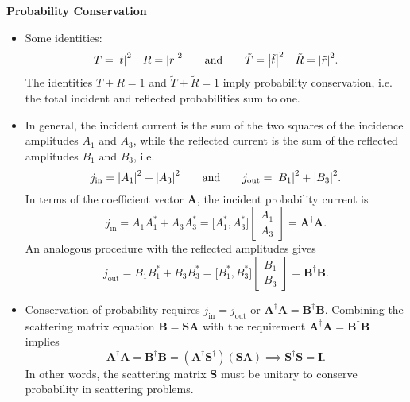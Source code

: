 \documentclass[11pt, a4paper]{article}
\newcommand{\eqtext}[1]{\qquad \text{#1} \qquad}
\renewcommand{\vec}[1]{\bm{#1}} %
\newcommand{\mat}[1]{\mathbf{#1}} %
\begin{document}
\textbf{Probability Conservation}
\begin{itemize}
	\item Some identities:
	\begin{equation*}
		T = \abs{t}^{2} \quad R = \abs{r}^{2} \eqtext{and} 		\tilde{T} = \abs{\tilde{t}}^{2} \quad \tilde{R} = \abs{\tilde{r}}^{2}.
	\end{equation*}
	The identities $ T + R = 1 $ and $ \tilde{T} + \tilde{R} = 1 $ imply probability conservation, i.e. the total incident and reflected probabilities sum to one. 
	
	\item In general, the incident current is the sum of the two squares of the incidence amplitudes $ A_{1} $ and $ A_{3} $, while the reflected current is the sum of the reflected amplitudes $ B_{1} $ and $ B_{3} $, i.e.
	\begin{equation*}
		j_{\text{in}} = \abs{A_{1}}^{2} + \abs{A_{3}}^{2} \eqtext{and} j_{\text{out}} = \abs{B_{1}}^{2} + \abs{B_{3}}^{2}.
	\end{equation*}
	In terms of the coefficient vector $ \vec{A} $, the incident probability current is
	\begin{equation*}
		j_{\text{in}} = A_{1}A_{1}^{*} + A_{3}A_{3}^{*} = \big[A_{1}^{*}, A_{3}^{*}\big]
		\begin{bmatrix}
			A_{1}\\
			A_{3}
		\end{bmatrix}
		= \vec{A}^{\dagger}\vec{A}.
	\end{equation*}
	An analogous procedure with the reflected amplitudes gives
	\begin{equation*}
		j_{\text{out}} = B_{1}B_{1}^{*} + B_{3}B_{3}^{*} = \big[B_{1}^{*}, B_{3}^{*}\big]
		\begin{bmatrix}
			B_{1}\\
			B_{3}
		\end{bmatrix}
		= \vec{B}^{\dagger}\vec{B}.
	\end{equation*}	
	
	\item Conservation of probability requires $ j_{\text{in}} = j_{\text{out}} $ or $ \vec{A}^{\dagger}\vec{A} = \vec{B}^{\dagger}\vec{B} $. Combining the scattering matrix equation $ \vec{B} = \mat{S}\vec{A} $ with the requirement $ \vec{A}^{\dagger}\vec{A} = \vec{B}^{\dagger}\vec{B} $ implies
	\begin{equation*}
		\vec{A}^{\dagger}\vec{A} = \vec{B}^{\dagger}\vec{B} = (\vec{A}^{\dagger}\mat{S}^{\dagger})(\mat{S}\vec{A}) \implies \vec{S}^{\dagger}\mat{S} = \mat{I}.
	\end{equation*}
	In other words, the scattering matrix $ \mat{S} $ must be unitary to conserve probability in scattering problems.
\end{itemize}
\end{document}
